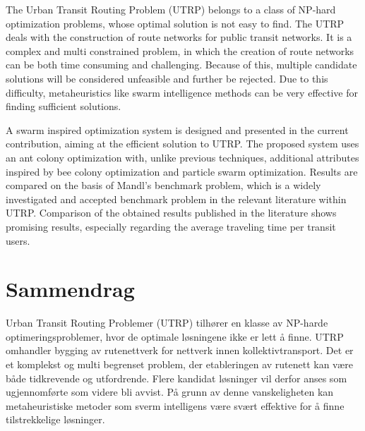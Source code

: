 

The Urban Transit Routing Problem (UTRP) belongs to a class of NP-hard optimization problems, whose optimal solution is not easy to find. The UTRP deals with the construction of route networks for public transit networks. It is a complex and multi constrained problem, in which the creation of route networks can be both time consuming and challenging. Because of this, multiple candidate solutions will be considered unfeasible and further be rejected. Due to this difficulty, metaheuristics like swarm intelligence methods can be very effective for finding sufficient solutions. 

A swarm inspired optimization system is designed and presented in the current contribution, aiming at the efficient solution to UTRP. The proposed system uses an ant colony optimization with, unlike previous techniques, additional attributes inspired by bee colony optimization and particle swarm optimization. Results are compared on the basis of Mandl's benchmark problem, which is a widely investigated and accepted benchmark problem in the relevant literature within UTRP. Comparison of the obtained results published in the literature shows promising results, especially regarding the average traveling time per transit users. 


\section*{Sammendrag}

Urban Transit Routing Problemer (UTRP) tilhører en klasse av NP-harde optimeringsproblemer, hvor de optimale løsningene ikke er lett å finne. UTRP omhandler bygging av rutenettverk for nettverk innen kollektivtransport. Det er et komplekst og multi begrenset problem, der etableringen av rutenett kan være både tidkrevende og utfordrende. Flere kandidat løsninger vil derfor anses som ugjennomførte som videre bli avvist. På grunn av denne vanskeligheten kan metaheuristiske metoder som sverm intelligens være svært effektive for å finne tilstrekkelige løsninger.

